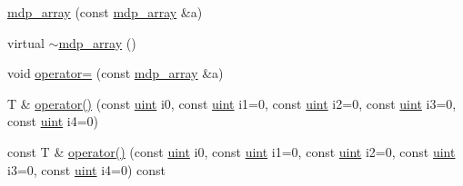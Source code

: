 \begin{DoxyCompactItemize}
\hyperlink{classmdp__array_af266114d51b7b0e038cb555ba02d83d4}{mdp\+\_\+array} (const \hyperlink{classmdp__array}{mdp\+\_\+array} \&a)
\item 
virtual \hyperlink{classmdp__array_a962dc25e9c53d9f6e215b0ef952fc96b}{$\sim$mdp\+\_\+array} ()
\item 
void \hyperlink{classmdp__array_a8f439abc20da235f12cd5d0ab4d7b56b}{operator=} (const \hyperlink{classmdp__array}{mdp\+\_\+array} \&a)
\item 
T \& \hyperlink{classmdp__array_a9e3a7e699387fb78562fb8d9c9ebea57}{operator()} (const \hyperlink{mdp__global__vars_8h_a91ad9478d81a7aaf2593e8d9c3d06a14}{uint} i0, const \hyperlink{mdp__global__vars_8h_a91ad9478d81a7aaf2593e8d9c3d06a14}{uint} i1=0, const \hyperlink{mdp__global__vars_8h_a91ad9478d81a7aaf2593e8d9c3d06a14}{uint} i2=0, const \hyperlink{mdp__global__vars_8h_a91ad9478d81a7aaf2593e8d9c3d06a14}{uint} i3=0, const \hyperlink{mdp__global__vars_8h_a91ad9478d81a7aaf2593e8d9c3d06a14}{uint} i4=0)
\item 
const T \& \hyperlink{classmdp__array_a67d8b7a2082f77d8ddf245bdaaae520a}{operator()} (const \hyperlink{mdp__global__vars_8h_a91ad9478d81a7aaf2593e8d9c3d06a14}{uint} i0, const \hyperlink{mdp__global__vars_8h_a91ad9478d81a7aaf2593e8d9c3d06a14}{uint} i1=0, const \hyperlink{mdp__global__vars_8h_a91ad9478d81a7aaf2593e8d9c3d06a14}{uint} i2=0, const \hyperlink{mdp__global__vars_8h_a91ad9478d81a7aaf2593e8d9c3d06a14}{uint} i3=0, const \hyperlink{mdp__global__vars_8h_a91ad9478d81a7aaf2593e8d9c3d06a14}{uint} i4=0) const
\end{DoxyCompactItemize}
